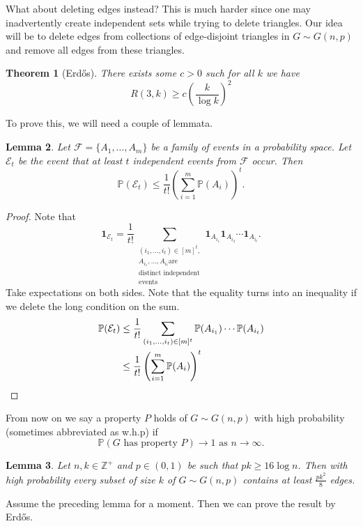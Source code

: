 \documentclass{report}
\theoremstyle{definition}
\theoremstyle{plain}
\newtheorem{thm}{Theorem}
\newtheorem{lem}[thm]{Lemma}
\theoremstyle{definition}
\begin{document}
	What about deleting edges instead? This is much harder since one may inadvertently create independent sets while trying to delete triangles. Our idea will be to delete edges from collections of edge-disjoint triangles in $G\sim G(n,p)$ and remove all edges from these triangles.
	
	\begin{thm}[Erd\H{o}s]\label{thm:erd_r3k_lb}
		There exists some $c>0$ such for all $k$ we have
		\[
			R(3,k) \geq c \left(\frac{k}{\log k}\right)^2
		\]
	\end{thm}
	To prove this, we will need a couple of lemmata. 
	\begin{lem}\label{lem:t_indep_events}
		Let $\mathcal{F}=\{A_1,\ldots, A_m\}$ be a family of events in a probability space. Let $\mathcal{E}_t$ be the event that at least $t$ independent events from $\mathcal{F}$ occur. Then
		\[
			\mathbb{P}(\mathcal{E}_t) \leq \frac{1}{t!} \left(\sum_{i=1}^{m}\mathbb{P}(A_i)\right)^t.
		\]
	\end{lem}
	\begin{proof}
		Note that 
		\[\mathbf{1}_{\mathcal{E}_t} = \frac{1}{t!}\sum_{\substack{(i_1,\ldots,i_t)\in [m]^{t},\\ A_{i_1},\ldots, A_{i_t} \text{are}\\ \text{distinct independent}\\ \text{events}}}\mathbf{1}_{A_{i_1}}\mathbf{1}_{A_{i_2}}\cdots \mathbf{1}_{A_{i_t}}.\]
		Take expectations on both sides. Note that the equality turns into an inequality if we delete the long condition on the sum.
		\begin{align*}
			\mathbb{P}(\mathcal{E}_t) &\leq \frac{1}{t!} \sum_{(i_1,\ldots,i_t)\in [m]^{t}} \mathbb{P}(A_{i_1}) \cdots \mathbb{P}(A_{i_t})\\
			& \leq \frac{1}{t!}\left(\sum_{i = 1}^{m}\mathbb{P}(A_i)\right)^t\qedhere
		\end{align*}
	\end{proof}
	From now on we say a property $P$ holds of $G\sim G(n,p)$ with high probability (sometimes abbreviated as w.h.p) if 
	\[
		\mathbb{P}(G\text{ has property }P) \to 1 \text{ as }n\to \infty.
	\]
	\begin{lem}\label{lem:high_prob_edges}
		Let $n,k\in\mathbb{Z}^{+}$ and $p\in (0,1)$ be such that $pk \geq 16 \log n$. Then with high probability every subset of size $k$ of $G\sim G(n,p)$ contains at least $\frac{pk^2}{8}$ edges.
	\end{lem}
	Assume the preceding lemma for a moment. Then we can prove the result by Erd\H{o}s.
\end{document}
